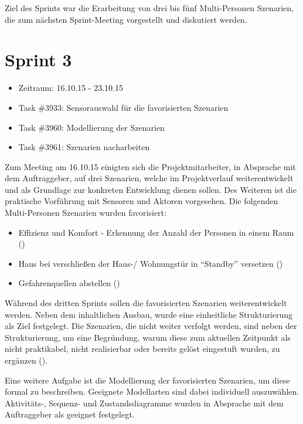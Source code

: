 \documentclass[12pt, oneside, smallheadings]{scrbook}
\begin{document}
Ziel des Sprints war die Erarbeitung von drei bis fünf Multi-Personen Szenarien, die zum nächsten Sprint-Meeting vorgestellt und diskutiert werden.

\section{Sprint 3}
\begin{itemize}
	\item Zeitraum: 16.10.15 - 23.10.15 \newline
	\item Task \#3933: Sensorauswahl für die favorisierten Szenarien
	\item Task \#3960: Modellierung der Szenarien
	\item Task \#3961: Szenarien nacharbeiten\\
\end{itemize}
\noindent
Zum Meeting am 16.10.15 einigten sich die Projektmitarbeiter, in Absprache mit dem Auftraggeber, auf drei Szenarien, welche im Projektverlauf weiterentwickelt und als Grundlage zur konkreten Entwicklung dienen sollen. Des Weiteren ist die praktische Vorführung mit Sensoren und Aktoren vorgesehen.
Die folgenden Multi-Personen Szenarien wurden favorisiert:
\begin{itemize}
	\item Effizienz und Komfort - Erkennung der Anzahl der Personen in einem Raum ()
	\item Haus bei verschließen der Haus-/ Wohnungstür in "`Standby"' versetzen ()
	\item Gefahrenquellen abstellen ()\\
\end{itemize}
\noindent
Während des dritten Sprints sollen die favorisierten Szenarien weiterentwickelt werden. Neben dem inhaltlichen Ausbau, wurde eine einheitliche Strukturierung als Ziel festgelegt. Die Szenarien, die nicht weiter verfolgt werden, sind neben der Strukturierung, um eine Begründung, warum diese zum aktuellen Zeitpunkt als nicht praktikabel, nicht realisierbar oder bereits gelöst eingestuft wurden, zu ergänzen ().

Eine weitere Aufgabe ist die Modellierung der favorisierten Szenarien, um diese formal zu beschreiben. Geeignete Modellarten sind dabei individuell auszuwählen. Aktivitäts-, Sequenz- und Zustandsdiagramme wurden in Absprache mit dem Auftraggeber als geeignet festgelegt.
\end{document}
